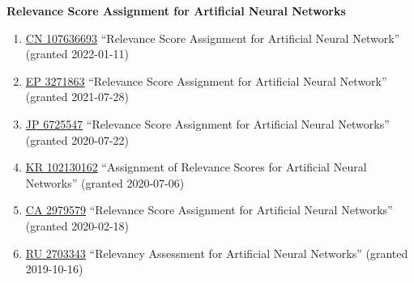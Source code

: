 \documentclass[10pt,a4paper]{article} %
\begin{document}

\newcommand{\patentref}[5]{\href{#4}{#1 #2} ``#3'' (granted #5)}
\headedsection %
{\bf Relevance Score Assignment for Artificial Neural Networks}
{
    \begin{enumerate}
        \item[] \patentref{CN}
                          {107636693}
                          {Relevance Score Assignment for Artificial Neural Network}
                          {https://patentimages.storage.googleapis.com/f0/97/e9/24faaaca17252c/CN107636693B.pdf}
                          {2022-01-11}

        \item [] \patentref{EP}
                           {3271863}
                           {Relevance Score Assignment for Artificial Neural Network}
                           {https://patentimages.storage.googleapis.com/0c/a1/63/580ce6ff29f011/EP3271863B1.pdf}
                           {2021-07-28}

        \item [] \patentref{JP}
                           {6725547}
                           {Relevance Score Assignment for Artificial Neural Networks}
                           {https://patentimages.storage.googleapis.com/91/ba/cc/36792436528537/JP6725547B2.pdf}
                           {2020-07-22}

        \item [] \patentref{KR}
                           {102130162}
                           {Assignment of Relevance Scores for Artificial Neural Networks}
                           {https://patentimages.storage.googleapis.com/80/b5/17/210f687345bb31/KR102130162B1.pdf}
                           {2020-07-06}

        \item [] \patentref{CA}
                           {2979579}
                           {Relevance Score Assignment for Artificial Neural Networks}
                           {https://patents.google.com/patent/CA2979579A1/en}
                           {2020-02-18}

        \item [] \patentref{RU}
                           {2703343}
                           {Relevancy Assessment for Artificial Neural Networks}
                           {https://patentimages.storage.googleapis.com/8d/ce/b5/70ef43a6d0f6e5/RU2703343C2.pdf}
                           {2019-10-16}
    \end{enumerate}
}
\end{document}

